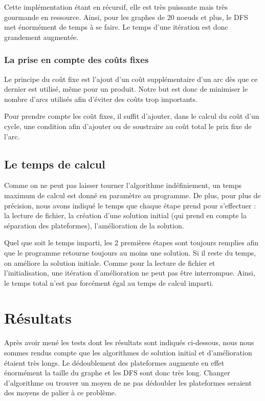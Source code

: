 \documentclass[a4paper,12pt]{article}
\begin{document}
Cette impl\'ementation \'etant en r\'ecursif, elle est tr\`es puissante mais tr\`es gourmande en ressource. Ainsi, pour les graphes de 20 noeuds et plus, le DFS met \'enorm\'ement de temps \`a se faire. Le temps d'une it\'eration est donc grandement augment\'ee.

\subsubsection{La prise en compte des co\^uts fixes}

Le principe du co\^ut fixe est l'ajout d'un co\^ut suppl\'ementaire d'un arc d\`es que ce dernier est utilis\'e, m\^eme pour un produit. Notre but est donc de minimiser le nombre d'arcs utilis\'es afin d'\'eviter des co\^uts trop importants.

Pour prendre compte les co\^ut fixes, il suffit d'ajouter, dans le calcul du co\^ut d'un cycle, une condition afin d'ajouter ou de soustraire au co\^ut total le prix fixe de l'arc.

\subsection{Le temps de calcul}

Comme on ne peut pas laisser tourner l'algorithme indéfiniement, un temps maximum de calcul est donné en paramètre au programme. De plus, pour plus de précision, nous avons indiqué le temps que chaque étape prend pour s'effectuer : la lecture de fichier, la création d'une solution initial (qui prend en compte la séparation des plateformes), l'amélioration de la solution.

Quel que soit le temps imparti, les 2 premières étapes sont toujours remplies afin que le programme retourne toujours au moins une solution. Si il reste du temps, on améliore la solution initiale. Comme pour la lecture de fichier et l'initialisation, une itération d'amélioration ne peut pas être interrompue. Ainsi, le temps total n'est pas forcément égal au temps de calcul imparti.

\section{R\'esultats}

Après avoir mené les tests dont les résultats sont indiqués ci-dessous, nous nous sommes rendus  compte que les algorithmes de solution initial et d'amélioration étaient très longs. Le dédoublement des plateformes augmente en effet énormément la taille du graphe et les DFS sont donc très long. Changer d'algorithme ou trouver un moyen de ne pas dédoubler les plateformes seraient des moyens de palier à ce problème.
\end{document}
